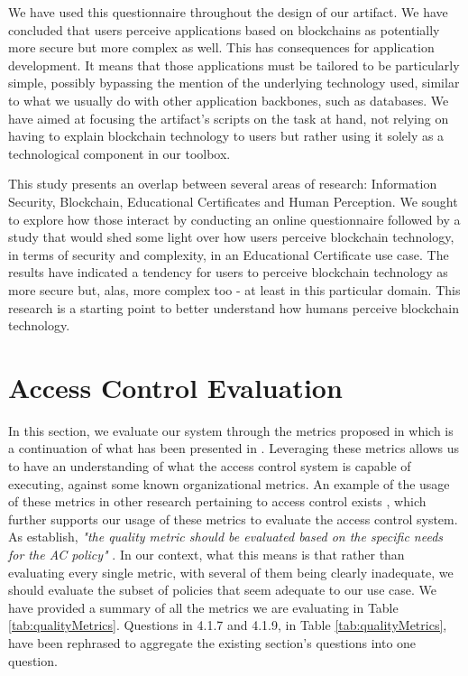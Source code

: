We have used this questionnaire throughout the design of our artifact. We have concluded that users perceive applications based on blockchains as potentially more secure but more complex as well. This has consequences for application development. It means that those applications must be tailored to be particularly simple, possibly bypassing the mention of the underlying technology used, similar to what we usually do with other application backbones, such as databases. We have aimed at focusing the artifact's scripts on the task at hand, not relying on having to explain blockchain technology to users but rather using it solely as a technological component in our toolbox.

This study presents an overlap between several areas of research: Information Security, Blockchain, Educational Certificates and Human Perception. We sought to explore how those interact by conducting an online questionnaire followed by a study that would shed some light over how users perceive blockchain technology, in terms of security and complexity, in an Educational Certificate use case. The results have indicated a tendency for users to perceive blockchain technology as more secure but, alas, more complex too - at least in this particular domain. This research is a starting point to better understand how humans perceive blockchain technology.

\section{Access Control Evaluation}
\label{sec:eval-ac}

In this section, we evaluate our system through the metrics proposed in \cite{hu_guidelines_2012} which is a continuation of what has been presented in \cite{hu_assessment_2006}. Leveraging these metrics allows us to have an understanding of what the access control system is capable of executing, against some known organizational metrics. An example of the usage of these metrics in other research pertaining to access control exists \cite{LE2014184}, which further supports our usage of these metrics to evaluate the access control system. As \citeauthor{hu_guidelines_2012} \cite{hu_guidelines_2012} establish, \emph{"the quality metric should be evaluated based on the specific needs for the AC policy"} \cite[25]{hu_guidelines_2012}. In our context, what this means is that rather than evaluating every single metric, with several of them being clearly inadequate, we should evaluate the subset of policies that seem adequate to our use case. We have provided a summary of all the metrics we are evaluating in Table \ref{tab:qualityMetrics}. Questions in 4.1.7 and 4.1.9, in Table \ref{tab:qualityMetrics}, have been rephrased to aggregate the existing section's questions into one question.

